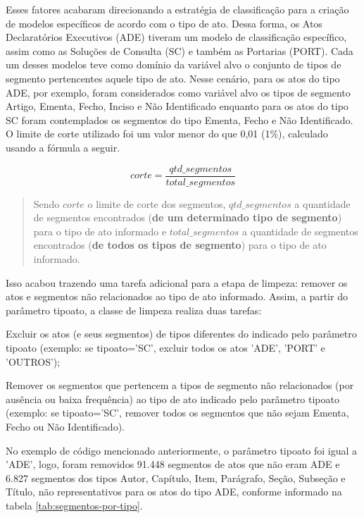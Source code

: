 Esses fatores acabaram direcionando a estratégia de classificação para a criação de modelos específicos de acordo com o tipo de ato. Dessa forma, os Atos Declaratórios Executivos (ADE) tiveram um modelo de classificação específico, assim como as Soluções de Consulta (SC) e também as Portarias (PORT). Cada um desses modelos teve como domínio da variável alvo o conjunto de tipos de segmento pertencentes aquele tipo de ato. Nesse cenário, para os atos do tipo ADE, por exemplo, foram considerados como variável alvo os tipos de segmento Artigo, Ementa, Fecho, Inciso e Não Identificado enquanto para os atos do tipo SC foram contemplados os segmentos do tipo Ementa, Fecho e Não Identificado. O limite de corte utilizado foi um valor menor do que 0,01 (1\%), calculado usando a fórmula a seguir.

\[ corte = \frac{qtd\_segmentos}{total\_segmentos} \]

\begin{quote}
Sendo \( corte \) o limite de corte dos segmentos, \( qtd\_segmentos \) a quantidade de segmentos encontrados (\textbf{de um determinado tipo de segmento}) para o tipo de ato informado e \( total\_segmentos \) a quantidade de segmentos encontrados (\textbf{de todos os tipos de segmento}) para o tipo de ato informado.
\end{quote}

Isso acabou trazendo uma tarefa adicional para a etapa de limpeza: remover os atos e segmentos não relacionados ao tipo de ato informado. Assim, a partir do parâmetro tipo\textunderscore ato, a classe de limpeza realiza duas tarefas: 
\begin{alineas}
	\item Excluir os atos (e seus segmentos) de tipos diferentes do indicado pelo parâmetro tipo\textunderscore ato (exemplo: se tipo\textunderscore ato='SC', excluir todos os atos 'ADE', 'PORT' e 'OUTROS');
	\item Remover os segmentos que pertencem a tipos de segmento não relacionados (por ausência ou baixa frequência) ao tipo de ato indicado pelo parâmetro tipo\textunderscore ato (exemplo: se tipo\textunderscore ato='SC', remover todos os segmentos que não sejam Ementa, Fecho ou Não Identificado).
\end{alineas}

No exemplo de código mencionado anteriormente, o parâmetro tipo\textunderscore ato foi igual a 'ADE', logo, foram removidos 91.448 segmentos de atos que não eram ADE e 6.827 segmentos dos tipos Autor, Capítulo, Item, Parágrafo, Seção, Subseção e Título, não representativos para os atos do tipo ADE, conforme informado na tabela \ref{tab:segmentos-por-tipo}. 